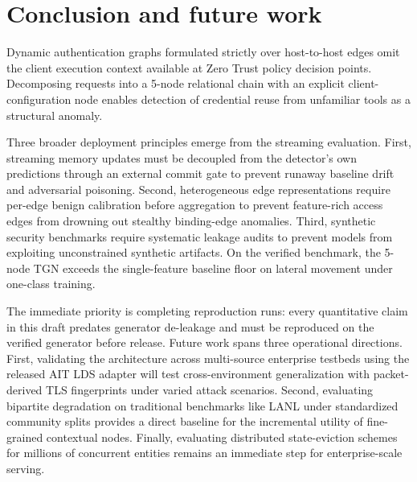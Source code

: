 \section{Conclusion and future work}
\label{sec:conclusion}

Dynamic authentication graphs formulated strictly over host-to-host edges omit the client
execution context available at Zero Trust policy decision points. Decomposing requests into a
5-node relational chain with an explicit client-configuration node enables detection of
credential reuse from unfamiliar tools as a structural anomaly.

Three broader deployment principles emerge from the streaming evaluation. First, streaming
memory updates must be decoupled from the detector's own predictions through an external
commit gate to prevent runaway baseline drift and adversarial poisoning. Second, heterogeneous
edge representations require per-edge benign calibration before aggregation to prevent feature-rich
access edges from drowning out stealthy binding-edge anomalies. Third, synthetic security benchmarks
require systematic leakage audits to prevent models from exploiting unconstrained synthetic artifacts.
On the verified benchmark, the 5-node TGN exceeds the single-feature baseline floor on lateral
movement under one-class training.

\ifpreliminary
The immediate priority is completing reproduction runs: every quantitative claim in this draft
predates generator de-leakage and must be reproduced on the verified generator before release.
\else
Future work spans three operational directions.
\fi
First, validating the architecture across multi-source enterprise testbeds using the released AIT LDS
adapter will test cross-environment generalization with packet-derived TLS fingerprints under varied
attack scenarios. Second, evaluating bipartite degradation on traditional benchmarks like LANL under
standardized community splits provides a direct baseline for the incremental utility of fine-grained
contextual nodes. Finally, evaluating distributed state-eviction schemes for millions of concurrent
entities remains an immediate step for enterprise-scale serving.
